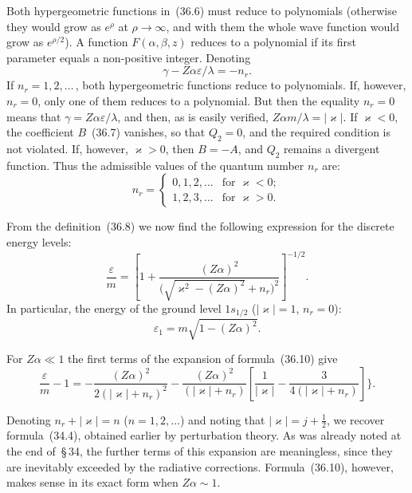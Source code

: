 Both hypergeometric functions in~(36.6) must reduce to polynomials (otherwise they would grow as $e^\rho$ at $\rho\to\infty$, and with them the whole wave function would grow as $e^{\rho/2}$). A function $F(\alpha,\beta,z)$ reduces to a polynomial if its first parameter equals a non-positive integer. Denoting
\begin{equation}
\gamma - Z\alpha\varepsilon/\lambda = -n_r.
\tag{36.8}
\end{equation}
If $n_r = 1, 2, \ldots\,$, both hypergeometric functions reduce to polynomials. If, however, $n_r = 0$, only one of them reduces to a polynomial. But then the equality $n_r = 0$ means that $\gamma = Z\alpha\varepsilon/\lambda$, and then, as is easily verified, $Z\alpha m/\lambda = |\varkappa|$. If $\varkappa < 0$, the coefficient $B$~(36.7) vanishes, so that $Q_2 = 0$, and the required condition is not violated. If, however, $\varkappa > 0$, then $B = -A$, and $Q_2$ remains a divergent function. Thus the admissible values of the quantum number $n_r$ are:
\begin{equation}
n_r =
\begin{cases}
0, 1, 2, \ldots & \text{for } \varkappa < 0;\\
1, 2, 3, \ldots & \text{for } \varkappa > 0.
\end{cases}
\tag{36.9}
\end{equation}

From the definition~(36.8) we now find the following expression for the discrete energy levels:
\begin{equation}
\frac{\varepsilon}{m} = \left[1 + \frac{(Z\alpha)^2}{\bigl(\sqrt{\varkappa^2 - (Z\alpha)^2} + n_r\bigr)^2}\right]^{-1/2}.
\tag{36.10}
\end{equation}
In particular, the energy of the ground level $1s_{1/2}$ ($|\varkappa| = 1$, $n_r = 0$):
\[
\varepsilon_1 = m\sqrt{1 - (Z\alpha)^2}.
\]

For $Z\alpha \ll 1$ the first terms of the expansion of formula~(36.10) give
\[
\frac{\varepsilon}{m} - 1 = -\frac{(Z\alpha)^2}{2(|\varkappa| + n_r)^2} - \frac{(Z\alpha)^2}{(|\varkappa| + n_r)}\!\left[\frac{1}{|\varkappa|} - \frac{3}{4(|\varkappa| + n_r)}\right]\!\Biggr\}.
\]

Denoting $n_r + |\varkappa| = n$ ($n = 1, 2, \ldots$) and noting that $|\varkappa| = j + \tfrac{1}{2}$, we recover formula~(34.4), obtained earlier by perturbation theory. As was already noted at the end of~\S\,34, the further terms of this expansion are meaningless, since they are inevitably exceeded by the radiative corrections. Formula~(36.10), however, makes sense in its exact form when $Z\alpha \sim 1$.


